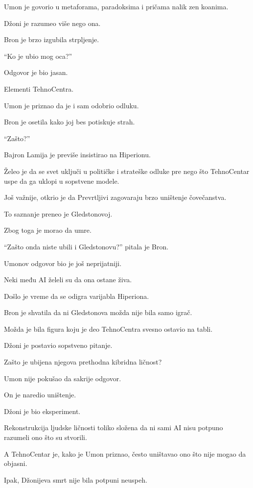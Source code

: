 Umon je govorio u metaforama, paradoksima i pričama nalik zen koanima.

Džoni je razumeo više nego ona.

Bron je brzo izgubila strpljenje.

``Ko je ubio mog oca?''

Odgovor je bio jasan.

Elementi TehnoCentra.

Umon je priznao da je i sam odobrio odluku.

Bron je osetila kako joj bes potiskuje strah.

``Zašto?''

Bajron Lamija je previše insistirao na Hiperionu.

Želeo je da se svet uključi u političke i strateške odluke pre nego što TehnoCentar uspe da ga uklopi u sopstvene modele.

Još važnije, otkrio je da Prevrtljivi zagovaraju brzo uništenje čovečanstva.

To saznanje preneo je Gledstonovoj.

Zbog toga je morao da umre.

\bigskip

``Zašto onda niste ubili i Gledstonovu?'' pitala je Bron.

Umonov odgovor bio je još neprijatniji.

Neki među AI želeli su da ona ostane živa.

Došlo je vreme da se odigra varijabla Hiperiona.

Bron je shvatila da ni Gledstonova možda nije bila samo igrač.

Možda je bila figura koju je deo TehnoCentra svesno ostavio na tabli.

\bigskip

Džoni je postavio sopstveno pitanje.

Zašto je ubijena njegova prethodna kibridna ličnost?

Umon nije pokušao da sakrije odgovor.

On je naredio uništenje.

Džoni je bio eksperiment.

Rekonstrukcija ljudske ličnosti toliko složena da ni sami AI nisu potpuno razumeli ono što su stvorili.

A TehnoCentar je, kako je Umon priznao, često uništavao ono što nije mogao da objasni.

Ipak, Džonijeva smrt nije bila potpuni neuspeh.


